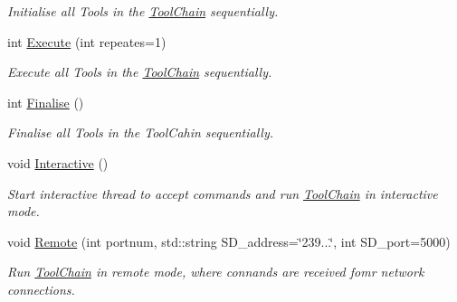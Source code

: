 \begin{DoxyCompactItemize}
\begin{DoxyCompactList}\small\item\em Initialise all Tools in the \hyperlink{classToolChain}{Tool\-Chain} sequentially. \end{DoxyCompactList}\item 
int \hyperlink{classToolChain_a303e299293fd4d3a5e91865e04898e52}{Execute} (int repeates=1)
\begin{DoxyCompactList}\small\item\em Execute all Tools in the \hyperlink{classToolChain}{Tool\-Chain} sequentially. \end{DoxyCompactList}\item 
\hypertarget{classToolChain_a3828756135773fb9ca4b361a47296dd9}{int \hyperlink{classToolChain_a3828756135773fb9ca4b361a47296dd9}{Finalise} ()}\label{classToolChain_a3828756135773fb9ca4b361a47296dd9}

\begin{DoxyCompactList}\small\item\em Finalise all Tools in the Tool\-Cahin sequentially. \end{DoxyCompactList}\item 
\hypertarget{classToolChain_a9bb47b83b6b85c3b0fab75af0cda19bf}{void \hyperlink{classToolChain_a9bb47b83b6b85c3b0fab75af0cda19bf}{Interactive} ()}\label{classToolChain_a9bb47b83b6b85c3b0fab75af0cda19bf}

\begin{DoxyCompactList}\small\item\em Start interactive thread to accept commands and run \hyperlink{classToolChain}{Tool\-Chain} in interactive mode. \end{DoxyCompactList}\item 
void \hyperlink{classToolChain_aacc213c07f81ee202dce14856a076df3}{Remote} (int portnum, std\-::string S\-D\-\_\-address=\char`\"{}239...\char`\"{}, int S\-D\-\_\-port=5000)
\begin{DoxyCompactList}\small\item\em Run \hyperlink{classToolChain}{Tool\-Chain} in remote mode, where connands are received fomr network connections. \end{DoxyCompactList}\end{DoxyCompactItemize}
